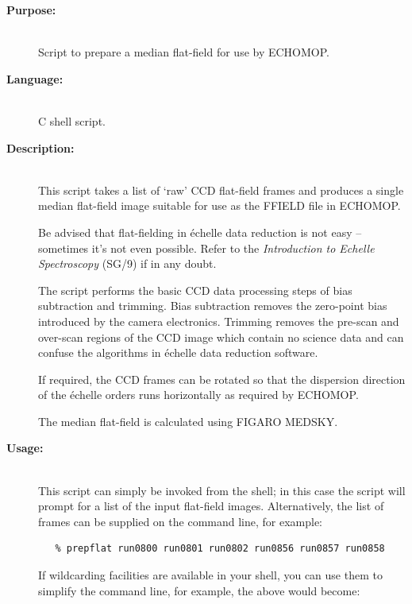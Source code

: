 \documentclass[twoside,11pt]{article}
\newcommand{\xref}[3]{#1}
\renewcommand{\_}{\texttt{\symbol{95}}}
\newcommand{\scspec}[2]{#1}
\newcommand{\scspec}[2]{#2}
\begin{document}
\begin{description}

\item [{\bf Purpose:}] \mbox{} \\
     Script to prepare a median flat-field for use by
     \xref{ECHOMOP}{sun152}{}.

\item [{\bf Language:}] \mbox{} \\
     C shell script.

\item [{\bf Description:}] \mbox{} \\
     This script takes a list of `raw' CCD flat-field frames and
     produces a single median flat-field image suitable for use as
     the FFIELD file in ECHOMOP.

     Be advised that flat-fielding in \'{e}chelle data reduction is not
     easy \scspec{--}{-} sometimes it's not even possible.  Refer to the
     \xref{{\sl Introduction to Echelle Spectroscopy}
     (SG/9)}{sg9}{flat_beware} if in any doubt.

     The script performs the basic CCD data processing steps of bias
     subtraction and trimming.  Bias subtraction removes the zero-point
     bias introduced by the camera electronics.  Trimming removes the
     pre-scan and over-scan regions of the CCD image which contain no
     science data and can confuse the algorithms in \'{e}chelle data
     reduction software.

     If required, the CCD frames can be rotated so that the dispersion
     direction of the \'{e}chelle orders runs horizontally as required by
     ECHOMOP.

     The median flat-field is calculated using FIGARO MEDSKY.

\item [{\bf Usage:}] \mbox{} \\
     This script can simply be invoked from the shell; in this case
     the script will prompt for a list of the input flat-field images.
     Alternatively, the list of frames can be supplied on the
     command line, for example:

\begin{verbatim}
   % prepflat run0800 run0801 run0802 run0856 run0857 run0858
\end{verbatim}

     If wildcarding facilities are available in your shell, you can use
     them to simplify the command line, for example, the above would
     become:


\end{description}
\end{document}
